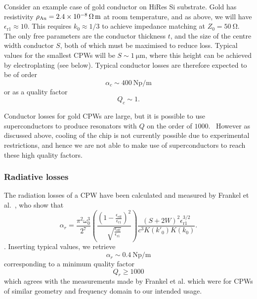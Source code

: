 Consider an example case of gold conductor on HiRes Si substrate. Gold has
resistivity $\rho_\mathrm{Au} = \SI{2.4E-8}{\ohm\metre}$ at room temperature,
and as above, we will have $\epsilon_\mathrm{r1} \approx 10$. This requires $k_0
\approx 1/3$ to achieve impedance matching at $Z_0 = \SI{50}{\ohm}$. The only
free parameters are the conductor thickness $t$, and the size of the centre
width conductor $S$, both of which must be maximised to reduce loss. Typical
values for the smallest CPWs will be $S\sim\SI{1}{\micro\metre}$, where
this height can be achieved by electroplating (see below). Typical
conductor losses are therefore expected to be of order
\begin{equation}
  \alpha_c \sim \SI{400}{\neper\per\metre}
\end{equation}
or as a quality factor
\begin{equation}
  Q_c \sim 1.
\end{equation}

Conductor losses for gold CPWs are large, but it is possible to use
superconductors to produce resonators with $Q$ on the order of
$1000$.~\cite{Booth1999, Wallraff2004} However as discussed above, cooling of
the chip is not currently possible due to experimental restrictions, and hence
we are not able to make use of superconductors to reach these high quality
factors.

\subsubsection*{Radiative losses}

The radiation losses of a CPW have been calculated and measured by Frankel et
al.~\cite{Frankel1991}, who show that
\begin{equation}
  \alpha_r = \frac{\pi^2 \omega_0^3}{2^7}\left(\frac{\left(1 -
  \frac{\epsilon_\mathrm{eff}}{\epsilon_\mathrm{r1}}\right)^2}{\sqrt{\frac{\epsilon_\mathrm{eff}}{\epsilon_\mathrm{r1}}}}\right)
  \frac{(S+2W)^2\epsilon_\mathrm{r1}^{3/2}}{c^3 K(k'_0)K(k_0)}.
\end{equation}.
Inserting typical values, we retrieve
\begin{equation}
  \alpha_r \sim \SI{0.4}{\neper\per\metre}
\end{equation}
corresponding to a minimum quality factor
\begin{equation}
  Q_r \geq 1000
\end{equation}
which agrees with the measurements made by Frankel et al. which were for CPWs of
similar geometry and frequency domain to our intended usage.

